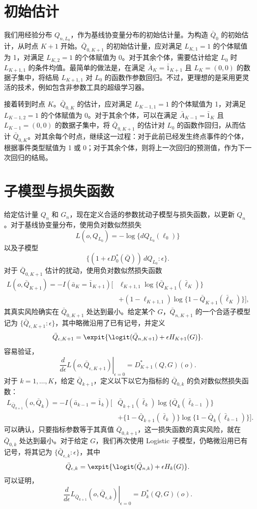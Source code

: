 \section{初始估计}

我们用经验分布 $Q_{n,L_0}$，作为基线协变量分布的初始估计量。为构造 $\bar Q_0$ 的初始估计，从时点 $K+1$ 开始。$\bar Q_{0,K+1}$ 的初始估计量，应对满足 $L_{K,1}=1$ 的个体赋值为 1，对满足 $L_{K,2}=1$ 的个体赋值为 0。对于其余个体，需要估计给定 $L_0$ 时 $L_{K+1,1}$ 的条件均值。最简单的做法是，在满足 $\bar A_K=\bar1_{K+1}$ 且 $L_K=(0,0)$ 的数据子集中，将结局 $L_{K+1,1}$ 对 $L_0$ 的函数作参数回归。不过，更理想的是采用更灵活的技术，例如包含非参数工具的超级学习器。

接着转到时点 $K$。$\bar Q_{0,K}$ 的估计，应对满足 $L_{K-1,1}=1$ 的个体赋值为 1，对满足 $L_{K-1,2}=1$ 的个体赋值为 0。对于其余个体，可以在满足 $\bar A_{K-1}=\bar1_K$ 且 $L_{K-1}=(0,0)$ 的数据子集中，将 $\bar Q_{0,K+1}$ 的估计对 $L_0$ 的函数作回归，从而估计 $\bar Q_{0,K}$。对其余每个时点，继续这一过程：对于此前已经发生终点事件的个体，根据事件类型赋值为 1 或 0；对于其余个体，则将上一次回归的预测值，作为下一次回归的结局。

\section{子模型与损失函数}

给定估计量 $Q_n$ 和 $G_n$，现在定义合适的参数扰动子模型与损失函数，以更新 $Q_n$。对于基线协变量分布，使用负对数似然损失
\[
 L(o,Q_{L_0})=-\log\{dQ_{L_0}(\ell_0)\}
\]
以及子模型
\[
 \{(1+\epsilon D_0^*(\bar Q))\,dQ_{L_0}:\epsilon\}.
\]
对于 $\bar Q_{0,K+1}$ 估计的扰动，使用负对数似然损失函数
\[
 \begin{aligned}
 L(o,\bar Q_{K+1})
 =-I(\bar a_K=\bar1_{K+1})\bigl[
 &\ell_{K+1,1}\log\{\bar Q_{K+1}(\bar\ell_K)\}\\
 &+(1-\ell_{K+1,1})\log\{1-\bar Q_{K+1}(\bar\ell_K)\}\bigr],
 \end{aligned}
\]
其真实风险确实在 $\bar Q_{0,K+1}$ 处达到最小。给定某个 $G$，$\bar Q_{n,K+1}$ 的一个合适子模型记为 $\{\bar Q_{\epsilon,K+1}:\epsilon\}$，其中略微沿用了已有记号，并定义
\[
 \bar Q_{\epsilon,K+1}
 =\expit\{\logit(\bar Q_{n,K+1})+\epsilon H_{K+1}(G)\}.
\]
容易验证，
\[
 \left.\frac{d}{d\epsilon}L(o,\bar Q_{\epsilon,K+1})\right|_{\epsilon=0}
 =D_{K+1}^*(Q,G)(o).
\]
对于 $k=1,\ldots,K$，给定 $\bar Q_{k+1}$，定义以下以它为指标的 $\bar Q_{0,k}$ 的负对数似然损失函数：
\[
 \begin{aligned}
 L_{\bar Q_{k+1}}(o,\bar Q_k)
 =-I(\bar a_{k-1}=\bar1_k)\bigl[
 &\bar Q_{k+1}(\bar\ell_k)\log\{\bar Q_k(\bar\ell_{k-1})\}\\
 &+\{1-\bar Q_{k+1}(\bar\ell_k)\}
 \log\{1-\bar Q_k(\bar\ell_{k-1})\}\bigr].
 \end{aligned}
\]
可以确认，只要指标参数等于其真值 $\bar Q_{0,k+1}$，这一损失函数的真实风险，就在 $\bar Q_{0,k}$ 处达到最小。对于给定 $G$，我们再次使用 Logistic 子模型，仍略微沿用已有记号，将其记为 $\{\bar Q_{\epsilon,k}:\epsilon\}$，其中
\[
 \bar Q_{\epsilon,k}
 =\expit\{\logit(\bar Q_{n,k})+\epsilon H_k(G)\}.
\]
可以证明，
\[
 \left.\frac{d}{d\epsilon}L_{\bar Q_{k+1}}(o,\bar Q_{\epsilon,k})\right|_{\epsilon=0}
 =D_k^*(Q,G)(o).
\]

